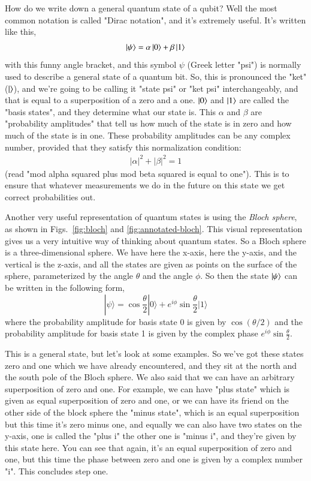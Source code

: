 How do we write down a general quantum state of a qubit? Well the most common notation is called "Dirac notation", and it's extremely useful. It's written like this,
\begin{align}
\ket{\psi} = \alpha\ket{0} + \beta\ket{1}
\end{align}
with this funny angle bracket, and this symbol $\psi$ (Greek letter "psi") is normally used to describe a general state of a quantum bit. So, this is pronounced the "ket" ($\ket{}$), and we're going to be calling it "state psi" or "ket psi" interchangeably, and that is equal to a superposition of a zero and a one. $\ket{0}$ and $\ket{1}$ are called the "basis states", and they determine what our state is. This $\alpha$ and $\beta$ are "probability amplitudes" that tell us how much of the state is in zero and how much of the state is in one.  These probability amplitudes can be any complex number, provided that they satisfy this normalization condition:
\begin{align}
    |\alpha|^2 + |\beta|^2 = 1
\end{align}
(read "mod alpha squared plus mod beta squared is equal to one"). This is to ensure that whatever measurements we do in the future on this state we get correct probabilities out.

Another very useful representation of quantum states is using the \emph{Bloch sphere}, as shown in Figs.~\ref{fig:bloch} and \ref{fig:annotated-bloch}. This visual representation gives us a very intuitive way of thinking about quantum states. So a Bloch sphere is a three-dimensional sphere. We have here the x-axis, here the y-axis, and the vertical is the z-axis, and all the states are given as points on the surface of the sphere, parameterized by the angle $\theta$ and the angle $\phi$. So then the state $\ket{\psi}$ can be written in the following form,
\begin{equation}
|\psi\rangle=\cos \frac{\theta}{2}|0\rangle+e^{i \phi} \sin \frac{\theta}{2}|1\rangle
\end{equation}
where the probability amplitude for basis state 0 is given by $\cos(\theta/2)$ and the probability amplitude for basis state 1 is given by the complex phase $e^{i \phi} \sin \frac{\theta}{2}$. 

This is a general state, but let's look at some examples. So we've got these states zero and one which we have already encountered, and they sit at the north and the south pole of the Bloch sphere. We also said that we can have an arbitrary superposition of zero and one. For example, we can have "plus state" which is given as equal superposition of zero and one, or we can have its friend on the other side of the block sphere the "minus state", which is an equal superposition but this time it's zero minus one, and equally we can also have two states on the y-axis, one is called the "plus i" the other one is "minus i", and they're given by this state here. You can see that again, it's an equal superposition of zero and one, but this time the phase between zero and one is given by a complex number "i".
This concludes step one.

